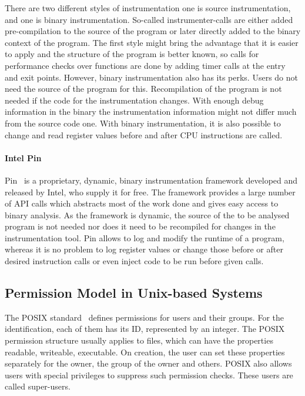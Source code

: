There are two different styles of instrumentation one is source instrumentation,
and one is binary instrumentation. So-called instrumenter-calls are either added
pre-compilation to the source of the program or later directly added to the
binary context of the program. The first style might bring the advantage that it
is easier to apply and the structure of the program is better known, so calls
for performance checks over functions are done by adding timer calls at the
entry and exit points. However, binary instrumentation also has its perks. Users
do not need the source of the program for this. Recompilation of the program is
not needed if the code for the instrumentation changes. With enough debug
information in the binary the instrumentation information might not differ much
from the source code one. With binary instrumentation, it is also possible to
change and read register values before and after CPU instructions are called.


\paragraph{Intel Pin}

Pin~\cite{pintool} is a proprietary, dynamic, binary instrumentation framework
developed and released by Intel, who supply it for free. The framework provides
a large number of API calls which abstracts most of the work done and gives easy
access to binary analysis. As the framework is dynamic, the source of the to be
analysed program is not needed nor does it need to be recompiled for changes in
the instrumentation tool. Pin allows to log and modify the runtime of a program,
whereas it is no problem to log register values or change those before or after
desired instruction calls or even inject code to be run before given calls.

\subsection{Permission Model in Unix-based Systems}

The POSIX standard~ defines permissions for users
and their groups. For the identification, each of them has its ID, represented
by an integer. The POSIX permission structure usually applies to files, which
can have the properties readable, writeable, executable. On creation, the user
can set these properties separately for the owner, the group of the owner and
others. POSIX also allows users with special privileges to suppress such
permission checks. These users are called super-users.

